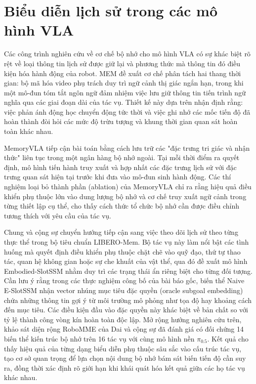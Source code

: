 \section{Biểu diễn lịch sử trong các mô hình VLA}

Các công trình nghiên cứu về cơ chế bộ nhớ cho mô hình VLA có sự khác biệt rõ rệt về loại thông tin lịch sử được giữ lại và phương thức mà thông tin đó điều kiện hóa hành động của robot. MEM \cite{mem2026} đề xuất cơ chế phân tách hai thang thời gian: bộ mã hóa video phụ trách duy trì ngữ cảnh thị giác ngắn hạn, trong khi một mô-đun tóm tắt ngôn ngữ đảm nhiệm việc lưu giữ thông tin tiến trình ngữ nghĩa qua các giai đoạn dài của tác vụ. Thiết kế này dựa trên nhận định rằng: việc phản ánh động học chuyển động tức thời và việc ghi nhớ các mốc tiến độ đã hoàn thành đòi hỏi các mức độ trừu tượng và khung thời gian quan sát hoàn toàn khác nhau.

MemoryVLA \cite{memoryvla2026} tiếp cận bài toán bằng cách lưu trữ các "đặc trưng tri giác và nhận thức" liên tục trong một ngân hàng bộ nhớ ngoài. Tại mỗi thời điểm ra quyết định, mô hình tiến hành truy xuất và hợp nhất các đặc trưng lịch sử với đặc trưng quan sát hiện tại trước khi đưa vào mô-đun sinh hành động. Các thí nghiệm loại bỏ thành phần (ablation) của MemoryVLA chỉ ra rằng hiệu quả điều khiển phụ thuộc lớn vào dung lượng bộ nhớ và cơ chế truy xuất ngữ cảnh trong từng thiết lập cụ thể, cho thấy cách thức tổ chức bộ nhớ cần được điều chỉnh tương thích với yêu cầu của tác vụ.

Chung và cộng sự \cite{liberomem2025} chuyển hướng tiếp cận sang việc theo dõi lịch sử theo từng thực thể trong bộ tiêu chuẩn LIBERO-Mem. Bộ tác vụ này làm nổi bật các tình huống mà quyết định điều khiển phụ thuộc chặt chẽ vào quỹ đạo, thứ tự thao tác, quan hệ không gian hoặc sự che khuất của vật thể, qua đó đề xuất mô hình Embodied-SlotSSM nhằm duy trì các trạng thái ẩn riêng biệt cho từng đối tượng. Cần lưu ý rằng trong các thực nghiệm công bố của bài báo gốc, biến thể Naive E-SlotSSM nhận vector nhúng mục tiêu đặc quyền (oracle subgoal embedding) chứa những thông tin gợi ý từ môi trường mô phỏng như tọa độ hay khoảng cách đến mục tiêu. Các điều kiện đầu vào đặc quyền này khác biệt về bản chất so với tỷ lệ thành công vòng kín hoàn toàn độc lập. Mở rộng hướng nghiên cứu trên, khảo sát diện rộng RoboMME của Dai và cộng sự \cite{robomme2026} đã đánh giá có đối chứng 14 biến thể kiến trúc bộ nhớ trên 16 tác vụ với cùng mô hình nền $\pi_{0.5}$. Kết quả cho thấy hiệu quả của từng dạng biểu diễn phụ thuộc sâu sắc vào cấu trúc tác vụ, tạo cơ sở quan trọng để lựa chọn nội dung bộ nhớ bám sát biến tiến độ cần suy ra, đồng thời xác định rõ giới hạn khi khái quát hóa kết quả giữa các họ tác vụ khác nhau.

